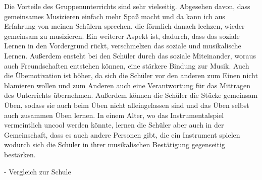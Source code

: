 Die Vorteile des Gruppenunterrichts sind sehr vielseitig. Abgesehen davon, dass
gemeinsames Musizieren einfach mehr Spaß macht und da kann ich aus Erfahrung von
meinen Schülern sprechen, die förmlich danach lechzen, wieder gemeinsam zu
musizieren. Ein weiterer Aspekt ist, dadurch, dass das soziale
Lernen in den Vordergrund rückt, verschmelzen das soziale und musikalische
Lernen. Außerdem ensteht bei den Schüler durch das soziale Miteinander, woraus
auch Freundschaften entstehen können, eine stärkere Bindung zur Musik. Auch die Übemotivation ist höher, da sich die Schüler vor den anderen
zum Einen nicht blamieren wollen und zum Anderen auch eine Verantwortung für das
Mittragen des Unterrichts übernehmen. Außerdem können die Schüler die Stücke
gemeinsam Üben, sodass sie auch beim Üben nicht alleingelassen sind und das Üben
selbst auch zusammen Üben lernen. In einem Alter, wo das Instrumentalspiel
vermeintlich uncool werden könnte, lernen die Schüler aber auch in der
Gemeinschaft, dass es auch andere Personen gibt, die ein Instrument spielen
wodurch sich die Schüler in ihrer musikalischen Bestätigung gegenseitig
bestärken. 

- Vergleich zur Schule


